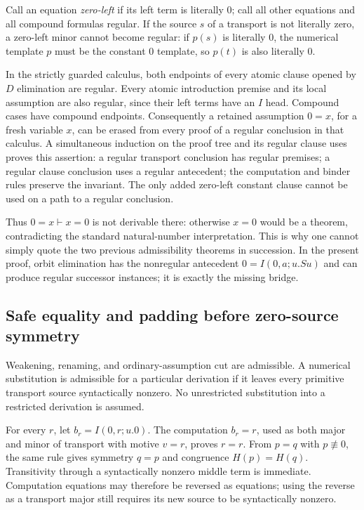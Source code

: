 \documentclass[11pt,letterpaper]{article}
\theoremstyle{definition}\newtheorem{definition}[theorem]{Definition}
\theoremstyle{remark}\newtheorem{remark}[theorem]{Remark}
\begin{document}
Call an equation \emph{zero-left} if its left term is literally $0$;
call all other equations and all compound formulas regular. If the source
$s$ of a transport is not literally zero, a zero-left minor cannot become
regular: if $p(s)$ is literally $0$, the numerical template $p$ must be the
constant $0$ template, so $p(t)$ is also literally $0$.

In the strictly guarded calculus, both endpoints of every atomic clause
opened by $D$ elimination are regular. Every atomic introduction premise
and its local assumption are also regular, since their left terms have an
$I$ head. Compound cases have compound endpoints. Consequently a retained
assumption $0=x$, for a fresh variable $x$, can be erased from every proof
of a regular conclusion in that calculus. A simultaneous induction on the
proof tree and its regular clause uses proves this assertion: a regular
transport conclusion has regular premises; a regular clause conclusion uses
a regular antecedent; the computation and binder rules preserve the
invariant. The only added zero-left constant clause cannot be used on a
path to a regular conclusion.

Thus $0=x\vdash x=0$ is not derivable there: otherwise $x=0$ would be a
theorem, contradicting the standard natural-number interpretation. This is
why one cannot simply quote the two previous admissibility theorems in
succession. In the present proof, orbit elimination has the nonregular
antecedent $0=I(0,a;u.Su)$ and can produce regular successor instances;
it is exactly the missing bridge.

\subsection{Safe equality and padding before zero-source symmetry}

Weakening, renaming, and ordinary-assumption cut are admissible. A numerical
substitution is admissible for a particular derivation if it leaves every
primitive transport source syntactically nonzero. No unrestricted
substitution into a restricted derivation is assumed.

For every $r$, let $b_r=I(0,r;u.0)$. The computation $b_r=r$, used as both
major and minor of transport with motive $v=r$, proves $r=r$.
From $p=q$ with $p\not\equiv0$, the same rule gives symmetry $q=p$ and
congruence $H(p)=H(q)$. Transitivity through a syntactically nonzero middle
term is immediate. Computation equations may therefore be reversed as
equations; using the reverse as a transport major still requires its new
source to be syntactically nonzero.
\end{document}
